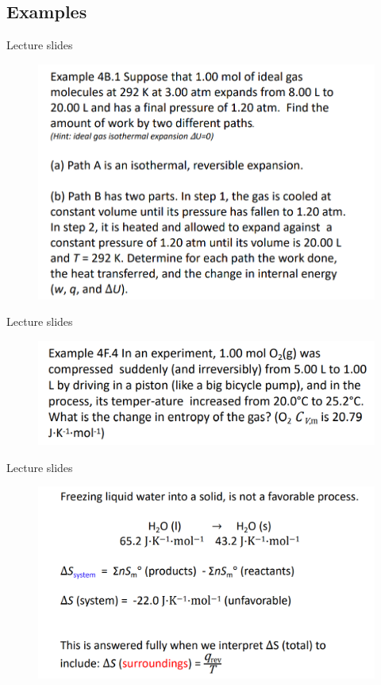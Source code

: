 \documentclass[12pt,compress]{beamer}
\begin{document}
\subsection{Examples}
\begin{frame}{Lecture slides}
    \begin{figure}[H]
        \centering
        \includegraphics[height=0.8\textheight]{example.png}
    \end{figure}
\end{frame}
\begin{frame}{Lecture slides}
    \begin{figure}[H]
        \centering
        \includegraphics[width=\textwidth]{slides.png}
    \end{figure}
\end{frame}
\begin{frame}{Lecture slides}
    \begin{figure}[H]
        \centering
        \includegraphics[width=\textwidth]{rev_phase.png}
    \end{figure}
\end{frame}
\end{document}
